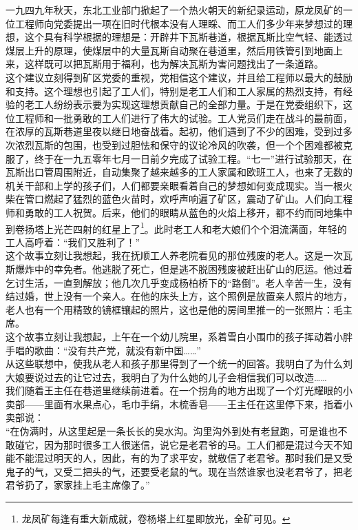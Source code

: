 一九四九年秋天，东北工业部门掀起了一个热火朝天的新纪录运动，原龙凤矿的一位工程师向党委提出一项在旧时代根本没有人理睬、而工人们多少年来梦想过的理想，这个具有科学根据的理想是：开辟井下瓦斯巷道，根据瓦斯比空气轻、能透过煤层上升的原理，使煤层中的大量瓦斯自动聚在巷道里，然后用铁管引到地面上来，这样既可以把瓦斯用于福利，也为解决瓦斯为害问题找出了一条道路。\\

这个建议立刻得到矿区党委的重视，党相信这个建议，并且给工程师以最大的鼓励和支持。这个理想也引起了工人们，特别是老工人们和工人家属的热烈支持，有经验的老工人纷纷表示要为实现这理想贡献自己的全部力量。于是在党委组织下，这位工程师和一批勇敢的工人们进行了伟大的试验。工人党员们走在战斗的最前面，在浓厚的瓦斯巷道里夜以继日地奋战着。起初，他们遇到了不少的困难，受到过多次浓烈瓦斯的包围，也受到过胆怯和保守的议论冷风的吹袭，但一个个困难都被克服了，终于在一九五零年七月一日前夕完成了试验工程。“七一”进行试验那天，在瓦斯出口管周围附近，自动集聚了越来越多的工人家属和欧班工人，也来了无数的机关干部和上学的孩子们，人们都要亲眼看着自己的梦想如何变成现实。当一根火柴在管口燃起了猛烈的蓝色火苗时，欢呼声响遍了矿区，震动了矿山。人们向工程师和勇敢的工人祝贺。后来，他们的眼睛从蓝色的火焰上移开，都不约而同地集中到卷扬塔上光芒四射的红星上了\footnote{龙凤矿每逢有重大新成就，卷杨塔上红星即放光，全矿可见。}。此时老工人和老大娘们个个泪流满面，年轻的工人高呼着：“我们又胜利了！”\\

这个故事立刻让我想起，我在抚顺工人养老院看见的那位残废的老人。这是一次瓦斯爆炸中的幸免者。他逃脱了死亡，但是逃不脱困残废被赶出矿山的厄运。他过着乞讨生活，一直到解放；他几次几乎变成杨柏桥下的“路倒”。老人辛苦一生，没有结过婚，世上没有一个亲人。在他的床头上方，这个照例是放置亲人照片的地方，老人也有一个用精致的镜框镶起的照片，这也是他的房间里推一的一张照片：毛主席。\\

这个故事立刻让我想起，上午在一个幼儿院里，系着雪白小围巾的孩子挥动着小胖手唱的歌曲：“没有共产党，就没有新中国……”\\

从这些联想中，使我从老人和孩子那里得到了一个统一的回答。我明白了为什么刘大娘要说过去的让它过去，我明白了为什么她的儿子会相信我们可以改造……\\

我们随着王主任在巷道里继续前进着。在一个拐角的地方出现了一个灯光耀眼的小卖部——里面有水果点心，毛巾手绢，木梳香皂——王主任在这里停下来，指着小卖部说：\\

“在伪满时，从这里起是一条长长的臭水沟。沟里沟外到处有老鼠跑，可是谁也不敢碰它，因为那时很多工人很迷信，说它是老君爷的马。工人们都是混过今天不知能不能混过明天的人，因此，有的为了求平安，就敬信了老君爷。那时我们是又受鬼子的气，又受二把头的气，还要受老鼠的气。现在当然谁家也没老君爷了，把老君爷扔了，家家挂上毛主席像了。”\\

